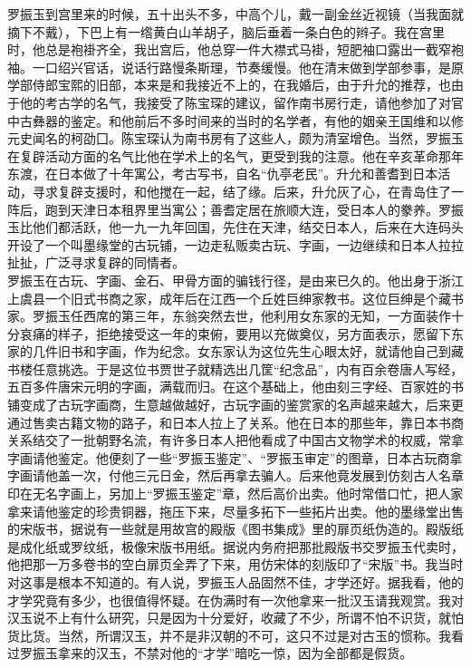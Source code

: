罗振玉到宫里来的时候，五十出头不多，中高个儿，戴一副金丝近视镜（当我面就摘下不戴），下巴上有一绺黄白山羊胡子，脑后垂着一条白色的辫子。我在宫里时，他总是袍褂齐全，我出宫后，他总穿一件大襟式马褂，短肥袖口露出一截窄袍袖。一口绍兴官话，说话行路慢条斯理，节奏缓慢。他在清末做到学部参事，是原学部侍郎宝熙的旧部，本来是和我接近不上的，在我婚后，由于升允的推荐，也由于他的考古学的名气，我接受了陈宝琛的建议，留作南书房行走，请他参加了对官中古彝器的鉴定。和他前后不多时间来的当时的名学者，有他的姻亲王国维和以修元史闻名的柯劭囗。陈宝琛认为南书房有了这些人，颇为清室增色。当然，罗振玉在复辟活动方面的名气比他在学术上的名气，更受到我的注意。他在辛亥革命那年东渡，在日本做了十年寓公，考古写书，自名“仇亭老民”。升允和善耆到日本活动，寻求复辟支援时，和他搅在一起，结了缘。后来，升允灰了心，在青岛住了一阵后，跑到天津日本租界里当寓公；善耆定居在旅顺大连，受日本人的豢养。罗振玉比他们都活跃，他一九一九年回国，先住在天津，结交日本人，后来在大连码头开设了一个叫墨缘堂的古玩铺，一边走私贩卖古玩、字画，一边继续和日本人拉拉扯扯，广泛寻求复辟的同情者。\\

罗振玉在古玩、字画、金石、甲骨方面的骗钱行径，是由来已久的。他出身于浙江上虞县一个旧式书商之家，成年后在江西一个丘姓巨绅家教书。这位巨绅是个藏书家。罗振玉任西席的第三年，东翁突然去世，他利用女东家的无知，一方面装作十分哀痛的样子，拒绝接受这一年的束俯，要用以充做奠仪，另方面表示，愿留下东家的几件旧书和字画，作为纪念。女东家认为这位先生心眼太好，就请他自己到藏书楼任意挑选。于是这位书贾世子就精选出几筐“纪念品”，内有百余卷唐人写经，五百多件唐宋元明的字画，满载而归。在这个基础上，他由刻三字经、百家姓的书铺变成了古玩字画商，生意越做越好，古玩字画的鉴赏家的名声越来越大，后来更通过售卖古籍文物的路子，和日本人拉上了关系。他在日本的那些年，靠日本书商关系结交了一批朝野名流，有许多日本人把他看成了中国古文物学术的权威，常拿字画请他鉴定。他便刻了一些“罗振玉鉴定”、“罗振玉审定”的图章，日本古玩商拿字画请他盖一次，付他三元日金，然后再拿去骗人。后来他竟发展到仿刻古人名章印在无名字画上，另加上“罗振玉鉴定”章，然后高价出卖。他时常借口忙，把人家拿来请他鉴定的珍贵铜器，拖压下来，尽量多拓下一些拓片出卖。他的墨缘堂出售的宋版书，据说有一些就是用故宫的殿版《图书集成》里的扉页纸伪造的。殿版纸是成化纸或罗纹纸，极像宋版书用纸。据说内务府把那批殿版书交罗振玉代卖时，他把那一万多卷书的空白扉页全弄了下来，用仿宋体的刻版印了“宋版”书。我当时对这事是根本不知道的。有人说，罗振玉人品固然不佳，才学还好。据我看，他的才学究竟有多少，也很值得怀疑。在伪满时有一次他拿来一批汉玉请我观赏。我对汉玉说不上有什么研究，只是因为十分爱好，收藏了不少，所谓不怕不识货，就怕货比货。当然，所谓汉玉，并不是非汉朝的不可，这只不过是对古玉的惯称。我看过罗振玉拿来的汉玉，不禁对他的“才学”暗吃一惊，因为全部都是假货。\\

